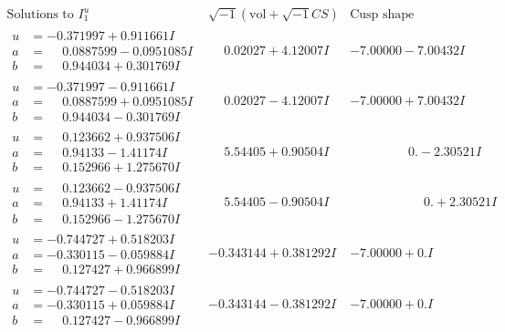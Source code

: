 \documentclass[1p]{elsarticle_modified}
\theoremstyle{definition}
\newcommand{\I}{\sqrt{-1}}
\begin{document}
$$\begin{array}{c|c|c}  
\text{Solutions to }I^u_{1}& \I (\text{vol} + \sqrt{-1}CS) & \text{Cusp shape}\\
 \hline 
\begin{aligned}
u &= -0.371997 + 0.911661 I \\
a &= \phantom{-}0.0887599 - 0.0951085 I \\
b &= \phantom{-}0.944034 + 0.301769 I\end{aligned}
 & \phantom{-}0.02027 + 4.12007 I & -7.00000 - 7.00432 I \\ \hline\begin{aligned}
u &= -0.371997 - 0.911661 I \\
a &= \phantom{-}0.0887599 + 0.0951085 I \\
b &= \phantom{-}0.944034 - 0.301769 I\end{aligned}
 & \phantom{-}0.02027 - 4.12007 I & -7.00000 + 7.00432 I \\ \hline\begin{aligned}
u &= \phantom{-}0.123662 + 0.937506 I \\
a &= \phantom{-}0.94133 - 1.41174 I \\
b &= \phantom{-}0.152966 + 1.275670 I\end{aligned}
 & \phantom{-}5.54405 + 0.90504 I & \phantom{-0.000000 } 0. - 2.30521 I \\ \hline\begin{aligned}
u &= \phantom{-}0.123662 - 0.937506 I \\
a &= \phantom{-}0.94133 + 1.41174 I \\
b &= \phantom{-}0.152966 - 1.275670 I\end{aligned}
 & \phantom{-}5.54405 - 0.90504 I & \phantom{-0.000000 -}0. + 2.30521 I \\ \hline\begin{aligned}
u &= -0.744727 + 0.518203 I \\
a &= -0.330115 - 0.059884 I \\
b &= \phantom{-}0.127427 + 0.966899 I\end{aligned}
 & -0.343144 + 0.381292 I & -7.00000 + 0. I\phantom{ +0.000000I} \\ \hline\begin{aligned}
u &= -0.744727 - 0.518203 I \\
a &= -0.330115 + 0.059884 I \\
b &= \phantom{-}0.127427 - 0.966899 I\end{aligned}
 & -0.343144 - 0.381292 I & -7.00000 + 0. I\phantom{ +0.000000I} \\ \hline\begin{aligned}

\end{aligned}
\end{array}$$
\end{document}
